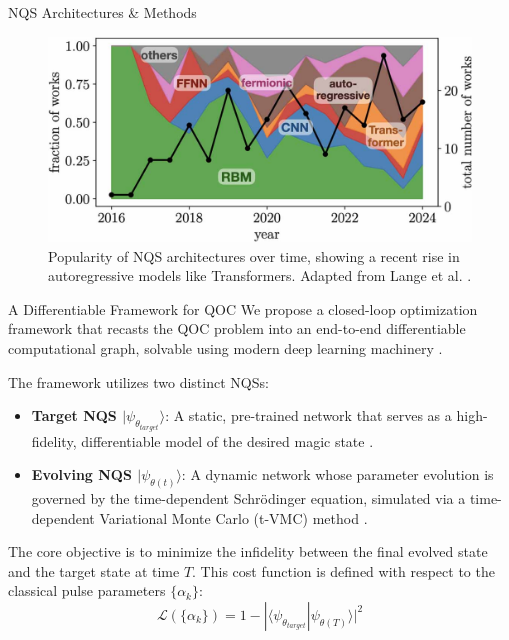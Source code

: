 \documentclass[final]{beamer}
\newlength{\colwidth}
\begin{document}
\begin{frame}[t]
\begin{columns}[t]
\begin{column}{\colwidth}
\begin{block}{NQS Architectures \& Methods}
    \begin{figure}
        \centering
        \includegraphics[width=0.3\paperwidth]{img/archtimes.jpg}
        \caption{Popularity of NQS architectures over time, showing a recent rise in autoregressive models like Transformers. Adapted from Lange et al. \cite{Lange2024Review}.}
    \end{figure}
\end{block}



  \begin{alertblock}{A Differentiable Framework for QOC}
    We propose a closed-loop optimization framework that recasts the QOC problem into an end-to-end differentiable computational graph, solvable using modern deep learning machinery \cite{Berni2025Proposal, Schaefer2020_diffprog}.
    
    The framework utilizes two distinct NQSs:
    \begin{itemize}
        \item \textbf{Target NQS $|\psi_{\theta_{target}}\rangle$}: A static, pre-trained network that serves as a high-fidelity, differentiable model of the desired magic state \cite{Berni2025Proposal}.
        \vspace{12px}
        \item \textbf{Evolving NQS $|\psi_{\theta(t)}\rangle$}: A dynamic network whose parameter evolution is governed by the time-dependent Schrödinger equation, simulated via a time-dependent Variational Monte Carlo (t-VMC) method \cite{Carleo2012}.
    \end{itemize}
    
    The core objective is to minimize the infidelity between the final evolved state and the target state at time $T$. This cost function is defined with respect to the classical pulse parameters $\{\alpha_{k}\}$:
    $$ \mathcal{L}(\{\alpha_{k}\}) = 1 - |\langle\psi_{\theta_{target}}|\psi_{\theta(T)}\rangle|^{2} $$
    

\end{alertblock}
\end{column}
\end{columns}
\end{frame}
\end{document}
